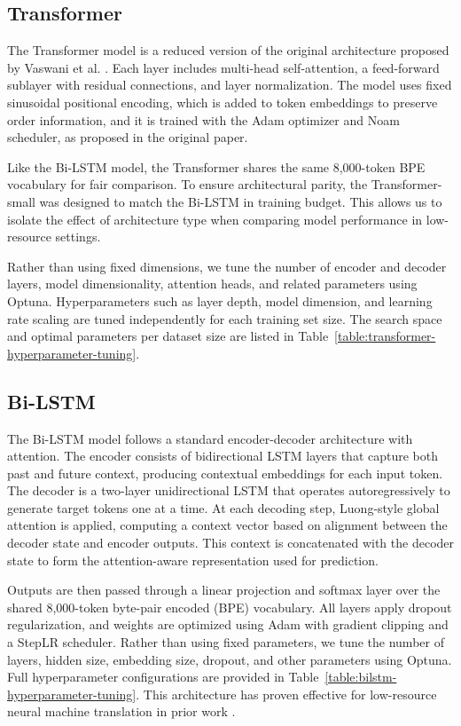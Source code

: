 \documentclass{article}
\begin{document}
\subsection{Transformer}
\label{subsec:transformer}
The Transformer model is a reduced version of the original architecture proposed by Vaswani et al. \citep{vaswani2017attention}. Each layer includes multi-head self-attention, a feed-forward sublayer with residual connections, and layer normalization. The model uses fixed sinusoidal positional encoding, which is added to token embeddings to preserve order information, and it is trained with the Adam optimizer and Noam scheduler, as proposed in the original paper.

Like the Bi-LSTM model, the Transformer shares the same 8,000-token BPE vocabulary for fair comparison. To ensure architectural parity, the Transformer-small was designed to match the Bi-LSTM in training budget. This allows us to isolate the effect of architecture type when comparing model performance in low-resource settings.

Rather than using fixed dimensions, we tune the number of encoder and decoder layers, model dimensionality, attention heads, and related parameters using Optuna. Hyperparameters such as layer depth, model dimension, and learning rate scaling are tuned independently for each training set size. The search space and optimal parameters per dataset size are listed in Table~\ref{table:transformer-hyperparameter-tuning}.

\subsection{Bi-LSTM}
\label{subsec:bi-lstm}
The Bi-LSTM model follows a standard encoder-decoder architecture with attention. The encoder consists of bidirectional LSTM layers that capture both past and future context, producing contextual embeddings for each input token. The decoder is a two-layer unidirectional LSTM that operates autoregressively to generate target tokens one at a time. At each decoding step, Luong-style global attention \citep{luong2015effectiveapproachesattentionbasedneural} is applied, computing a context vector based on alignment between the decoder state and encoder outputs. This context is concatenated with the decoder state to form the attention-aware representation used for prediction.

Outputs are then passed through a linear projection and softmax layer over the shared 8,000-token byte-pair encoded (BPE) vocabulary. All layers apply dropout regularization, and weights are optimized using Adam with gradient clipping and a StepLR scheduler. Rather than using fixed parameters, we tune the number of layers, hidden size, embedding size, dropout, and other parameters using Optuna. Full hyperparameter configurations are provided in Table~\ref{table:bilstm-hyperparameter-tuning}. This architecture has proven effective for low-resource neural machine translation in prior work \citep{sennrich2019revisitinglowresourceneuralmachine}.
\end{document}
